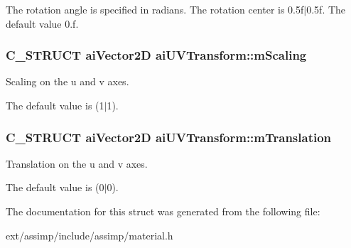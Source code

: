 The rotation angle is specified in radians. The rotation center is 0.\-5f$\vert$0.5f. The default value 0.\-f. \hypertarget{structai_u_v_transform_a89429a027cbf914e7212e48149a957c8}{
\subsubsection[{m\-Scaling}]{\setlength{\rightskip}{0pt plus 5cm}C\-\_\-\-S\-T\-R\-U\-C\-T {\bf ai\-Vector2\-D} ai\-U\-V\-Transform\-::m\-Scaling}}\label{structai_u_v_transform_a89429a027cbf914e7212e48149a957c8}
Scaling on the u and v axes.

The default value is (1$\vert$1). \hypertarget{structai_u_v_transform_a8c7f35959aa342bf0cef670246fbb813}{
\subsubsection[{m\-Translation}]{\setlength{\rightskip}{0pt plus 5cm}C\-\_\-\-S\-T\-R\-U\-C\-T {\bf ai\-Vector2\-D} ai\-U\-V\-Transform\-::m\-Translation}}\label{structai_u_v_transform_a8c7f35959aa342bf0cef670246fbb813}
Translation on the u and v axes.

The default value is (0$\vert$0). 

The documentation for this struct was generated from the following file\-:\begin{DoxyCompactItemize}
\item 
ext/assimp/include/assimp/material.\-h\end{DoxyCompactItemize}
